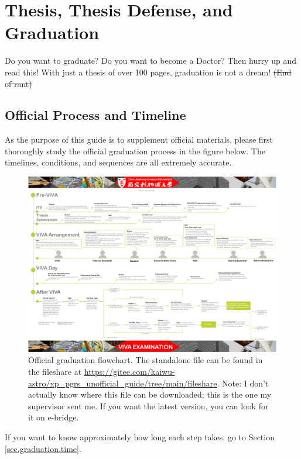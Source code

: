 \section{Thesis, Thesis Defense, and Graduation}
\label{sec.thesis_viva_graduation}

Do you want to graduate? Do you want to become a Doctor? Then hurry up and read this! With just a thesis of over 100 pages, graduation is not a dream! \sout{(End of rant)}

\subsection{Official Process and Timeline}
\label{sec.official.flowchart}

As the purpose of this guide is to supplement official materials, please first thoroughly study the official graduation process in the figure below. The timelines, conditions, and sequences are all extremely accurate.

\begin{figure}[H]
    \centering
    \includegraphics[width=\columnwidth]{fileshare/XJTLU VIVA Examination Arrangement Flowchart_2023.pdf}
    \caption{Official graduation flowchart. The standalone file can be found in the fileshare at \url{https://gitee.com/kaiwu-astro/xp_pgrs_unofficial_guide/tree/main/fileshare}. Note: I don't actually know where this file can be downloaded; this is the one my supervisor sent me. If you want the latest version, you can look for it on e-bridge.}
\end{figure}

If you want to know approximately how long each step takes, go to Section \ref{sec.graduation.time}.

